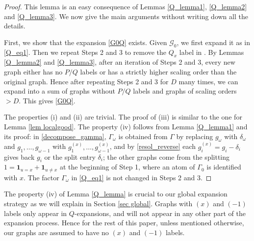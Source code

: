 \documentclass{article}
\newcommand{\1}{\mathds{1}}
\numberwithin{equation}{section}
\newcommand{\be}{\begin{equation}}
\newcommand{\ee}{\end{equation}}
\renewcommand{\cal}{\mathcal}
\newcommand{\wt}{\widetilde}
\theoremstyle{plain} %
\theoremstyle{remark}
\begin{document}
\begin{proof}
This lemma is an easy consequence of Lemmas \ref{Q_lemma1}, \ref{Q_lemma2} and \ref{Q_lemma3}. We now give the main arguments without writing down all the details.

First, we show that the expansion \eqref{G0Q} exists. Given $\cal G_0$, we first expand it as in \eqref{Q_eq1}. Then we repeat Steps 2 and 3 to remove the $Q_x$ label in \smash{$\Gamma_\omega Q_x(\wt \Gamma_{\omega}) $}. By Lemmas \ref{Q_lemma2} and \ref{Q_lemma3}, after an iteration of Steps 2 and 3, every new graph either has no $P/Q$ labels or has a strictly higher scaling order than the original graph. Hence after repeating Steps 2 and 3 for $D$ many times, we can expand \smash{$\Gamma_\omega Q_x(\wt \Gamma_{\omega})$} into a sum of graphs without $P/Q$ labels and graphs of scaling orders $>D$. This gives \eqref{G0Q}.

The properties (i) and (ii) are trivial. The proof of (iii) is similar to the one for Lemma \ref{lem localgood}. The property (iv) follows from Lemma \ref{Q_lemma1} and its proof: in \eqref{decompose_gamma}, $\Gamma_\omega$ is obtained from $\Gamma$ by replacing $g_\omega$ with $\delta_\omega$ and $g_1,\ldots,g_{\omega-1}$ with $g_1^{(x)},\ldots,g_{\omega-1}^{(x)}$, and by \eqref{resol_reverse} each $g_i^{(x)}=g_i-\delta_i$ gives back $g_i$ or the split entry $\delta_i$; the other graphs come from the splitting $1=\mathbf 1_{u=x}+\mathbf 1_{u\ne x}$ at the beginning of Step 1, where an atom of $\Gamma_0$ is identified with $x$. The factor $\Gamma_\omega$ in \eqref{Q_eq1} is not changed in Steps 2 and 3.
\end{proof}
 
The property (iv) of Lemma \ref{Q_lemma} is crucial to our global expansion strategy as we will explain in Section \ref{sec global}. Graphs with $(x)$ and $(-1)$ labels only appear in $Q$-expansions, and will not appear in any other part of the expansion process. Hence for the rest of this paper, unless mentioned otherwise, our graphs are assumed to have no $(x)$ and $(-1)$ labels.  
 
% 
%  
  
\end{document}
